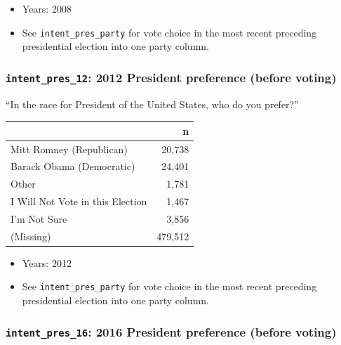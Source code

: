 \documentclass[10pt,article,oneside]{memoir}
\theoremstyle{definition}
\begin{document}
\begin{itemize}
\tightlist
\item
  Years: 2008
\item
  See \texttt{intent\_pres\_party} for vote choice in the most recent
  preceding presidential election into one party column.
\end{itemize}

\hypertarget{intent_pres_12-2012-president-preference-before-voting}{%
\subsubsection{\texorpdfstring{\texttt{intent\_pres\_12}: 2012 President
preference (before
voting)}{intent\_pres\_12: 2012 President preference (before voting)}}\label{intent_pres_12-2012-president-preference-before-voting}}

``In the race for President of the United States, who do you prefer?''

\begin{table}[H]
\centering
\begin{tabular}[t]{lr}
\toprule
 & n\\
\midrule
Mitt Romney (Republican) & 20,738\\
Barack Obama (Democratic) & 24,401\\
Other & 1,781\\
I Will Not Vote in this Election & 1,467\\
I'm Not Sure & 3,856\\
(Missing) & 479,512\\
\bottomrule
\end{tabular}
\end{table}

\begin{itemize}
\tightlist
\item
  Years: 2012
\item
  See \texttt{intent\_pres\_party} for vote choice in the most recent
  preceding presidential election into one party column.
\end{itemize}

\hypertarget{intent_pres_16-2016-president-preference-before-voting}{%
\subsubsection{\texorpdfstring{\texttt{intent\_pres\_16}: 2016 President
preference (before
voting)}{intent\_pres\_16: 2016 President preference (before voting)}}\label{intent_pres_16-2016-president-preference-before-voting}}
\end{document}
